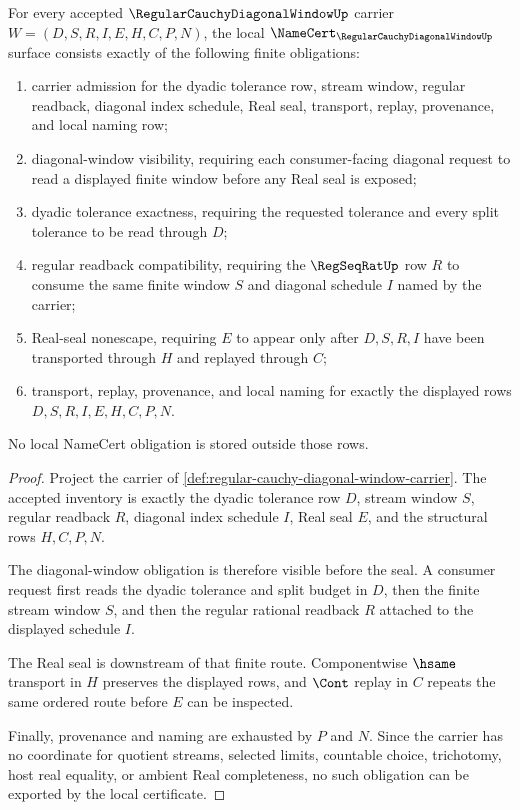 \begin{theorem}
\label{thm:regular-cauchy-diagonal-window-obligations}
For every accepted $\RegularCauchyDiagonalWindowUp$ carrier $W=(D,S,R,I,E,H,C,P,N)$, the local $\NameCert_{\RegularCauchyDiagonalWindowUp}$ surface consists exactly of the following finite obligations:
\begin{enumerate}
\item carrier admission for the dyadic tolerance row, stream window, regular readback, diagonal index schedule, Real seal, transport, replay, provenance, and local naming row;
\item diagonal-window visibility, requiring each consumer-facing diagonal request to read a displayed finite window before any Real seal is exposed;
\item dyadic tolerance exactness, requiring the requested tolerance and every split tolerance to be read through $D$;
\item regular readback compatibility, requiring the $\RegSeqRatUp$ row $R$ to consume the same finite window $S$ and diagonal schedule $I$ named by the carrier;
\item Real-seal nonescape, requiring $E$ to appear only after $D,S,R,I$ have been transported through $H$ and replayed through $C$;
\item transport, replay, provenance, and local naming for exactly the displayed rows $D,S,R,I,E,H,C,P,N$.
\end{enumerate}
No local NameCert obligation is stored outside those rows.
\end{theorem}
\begin{proof}
Project the carrier of \autoref{def:regular-cauchy-diagonal-window-carrier}. The accepted inventory is exactly the dyadic tolerance row $D$, stream window $S$, regular readback $R$, diagonal index schedule $I$, Real seal $E$, and the structural rows $H,C,P,N$.

The diagonal-window obligation is therefore visible before the seal. A consumer request first reads the dyadic tolerance and split budget in $D$, then the finite stream window $S$, and then the regular rational readback $R$ attached to the displayed schedule $I$.

The Real seal is downstream of that finite route. Componentwise $\hsame$ transport in $H$ preserves the displayed rows, and $\Cont$ replay in $C$ repeats the same ordered route before $E$ can be inspected.

Finally, provenance and naming are exhausted by $P$ and $N$. Since the carrier has no coordinate for quotient streams, selected limits, countable choice, trichotomy, host real equality, or ambient Real completeness, no such obligation can be exported by the local certificate.
\end{proof}

